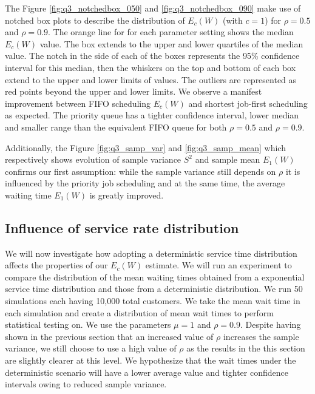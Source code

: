 \documentclass{article}
\begin{document}
    The Figure \ref{fig:q3_notchedbox_050} and \ref{fig:q3_notchedbox_090} make use of notched box plots to describe the distribution of $E_c(W)$ (with $c = 1$) for $\rho = 0.5$ and $\rho = 0.9$. The orange line for for each parameter setting shows the median $E_c(W)$ value. The box extends to the upper and lower quartiles of the median value. The notch in the side of each of the boxes represents the 95\% confidence interval for this median, then the whiskers on the top and bottom of each box extend to the upper and lower limits of values. The outliers are represented as red points beyond the upper and lower limits. We observe a manifest improvement between FIFO scheduling $E_c(W)$ and shortest job-first scheduling as expected. The priority queue has a tighter confidence interval, lower median and smaller range than the equivalent FIFO queue for both $\rho = 0.5$ and $\rho = 0.9$.


    Additionally, the Figure \ref{fig:q3_samp_var} and \ref{fig:q3_samp_mean} which respectively shows evolution of sample variance $S^2$ and sample mean $E_1(W)$ confirms our first assumption: while the sample variance still depends on $\rho$ it is influenced by the priority job scheduling and at the same time, the average waiting time $E_1(W)$ is greatly improved.

    \subsection*{Influence of service rate distribution}

    We will now investigate how adopting a deterministic service time distribution affects the properties of our $E_c(W)$ estimate. We will run an experiment to compare the distribution of the mean waiting times obtained from a exponential service time distribution and those from a deterministic distribution. We run 50 simulations each having 10,000 total customers. We take the mean wait time in each simulation and create a distribution of mean wait times to perform statistical testing on. We use the parameters $\mu = 1$ and $\rho = 0.9$. Despite having shown in the previous section that an increased value of $\rho$ increases the sample variance, we still choose to use a high value of $\rho$ as the results in the this section are slightly clearer at this level. We hypothesize that the wait times under the deterministic scenario will have a lower average value and tighter confidence intervals owing to reduced sample variance.
\end{document}

